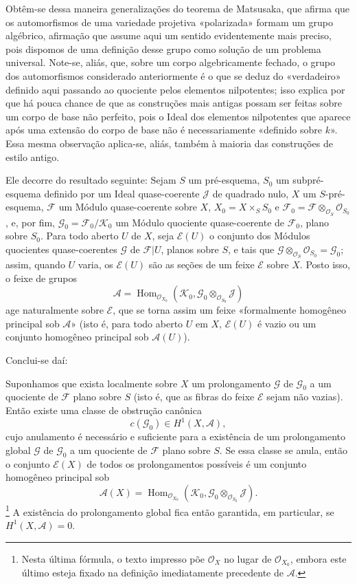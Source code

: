 Obtêm-se dessa maneira generalizações do teorema de Matsusaka, que afirma
que os automorfismos de uma variedade projetiva «polarizada» formam um grupo
algébrico, afirmação que assume aqui um sentido evidentemente mais preciso,
pois dispomos de uma definição desse grupo como solução de um problema
universal. Note-se, aliás, que, sobre um corpo algebricamente fechado, o grupo
dos automorfismos considerado anteriormente é o que se deduz do «verdadeiro»
definido aqui passando ao quociente pelos elementos nilpotentes; isso explica
por que há pouca chance de que as construções mais antigas possam ser feitas
sobre um corpo de base não perfeito, pois o Ideal dos elementos nilpotentes que
aparece após uma extensão do corpo de base não é necessariamente «definido
sobre $k$». Essa mesma observação aplica-se, aliás, também à maioria das construções
de estilo antigo.


Ele decorre do resultado seguinte:
 Sejam $S$ um pré-esquema, $S_0$ um subpré-esquema
definido por um Ideal quase-coerente $\mathcal J$ de quadrado nulo, $X$ um
$S$-pré-esquema, $\mathcal F$ um Módulo quase-coerente sobre $X$,
$X_0=X\times_SS_0$ e
$\mathcal F_0=\mathcal F\otimes_{\mathcal O_S}\mathcal O_{S_0}$, e, por fim,
$\mathcal G_0=\mathcal F_0/\mathcal K_0$ um Módulo quociente quase-coerente de
$\mathcal F_0$, plano sobre $S_0$. Para todo aberto $U$ de $X$, seja
$\mathcal E(U)$ o conjunto dos Módulos quocientes quase-coerentes $\mathcal G$ de
$\mathcal F|U$, planos sobre $S$, e tais que
$\mathcal G\otimes_{\mathcal O_S}\mathcal O_{S_0}=\mathcal G_0$; assim, quando
$U$ varia, os $\mathcal E(U)$ são as seções de um feixe $\mathcal E$ sobre
$X$. Posto isso, o feixe de grupos
\[
\mathcal A=\operatorname{Hom}_{\mathcal O_{X_0}}
(\mathcal K_0,\mathcal G_0\otimes_{\mathcal O_{S_0}}\mathcal J)
\]
age naturalmente sobre $\mathcal E$, que se torna assim um feixe
«formalmente homogêneo principal sob $\mathcal A$» (isto é, para todo aberto
$U$ em $X$, $\mathcal E(U)$ é vazio ou um conjunto homogêneo principal sob
$\mathcal A(U)$).

Conclui-se daí:

 Suponhamos que exista localmente sobre $X$ um
prolongamento $\mathcal G$ de $\mathcal G_0$ a um quociente de $\mathcal F$
plano sobre $S$ (isto é, que as fibras do feixe $\mathcal E$ sejam não vazias).
Então existe uma classe de obstrução canônica
\[
c(\mathcal G_0)\in H^1(X,\mathcal A),
\]
cujo anulamento é necessário e suficiente para a existência de um
prolongamento global $\mathcal G$ de $\mathcal G_0$ a um quociente de
$\mathcal F$ plano sobre $S$. Se essa classe se anula, então o conjunto
$\mathcal E(X)$ de todos os prolongamentos possíveis é um conjunto homogêneo
principal sob
\[
\mathcal A(X)=\operatorname{Hom}_{\mathcal O_{X_0}}
(\mathcal K_0,\mathcal G_0\otimes_{\mathcal O_{S_0}}\mathcal J).
\]
\footnote{Nesta última fórmula, o texto impresso põe $\mathcal O_X$ no lugar
de $\mathcal O_{X_0}$, embora este último esteja fixado na definição
imediatamente precedente de $\mathcal A$.}
A existência do prolongamento global fica então garantida, em particular, se
$H^1(X,\mathcal A)=0$.

